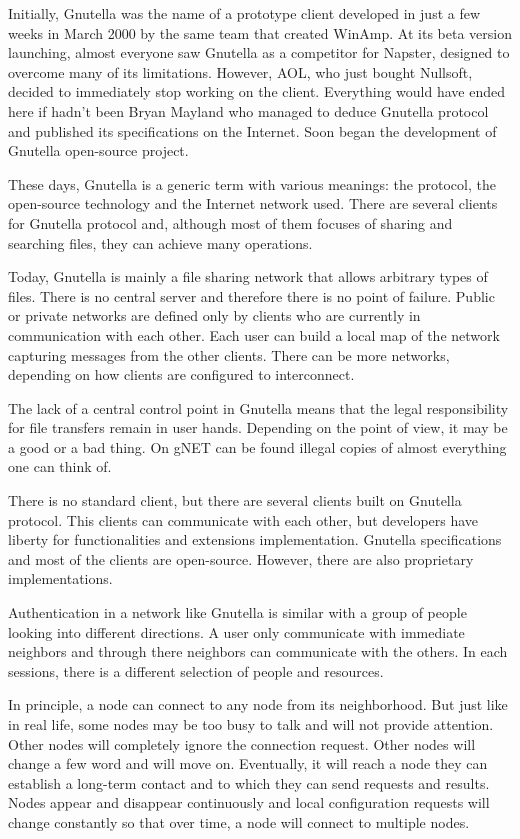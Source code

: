 Initially, Gnutella was the name of a prototype client developed in just a few
weeks in March 2000 by the same team that created WinAmp. At its beta version
launching, almost everyone saw Gnutella as a competitor for Napster, designed
to overcome many of its limitations. However, AOL, who just bought Nullsoft,
decided to immediately stop working on the client. Everything would have ended
here if hadn't been Bryan Mayland who managed to deduce Gnutella protocol and
published its specifications on the Internet. Soon began the development of
Gnutella open-source project.

These days, Gnutella is a generic term with various meanings: the protocol, the
open-source technology and the Internet network used. There are several clients
for Gnutella protocol and, although most of them focuses of sharing and
searching files, they can achieve many operations.

Today, Gnutella is mainly a file sharing network that allows arbitrary types of
files. There is no central server and therefore there is no point of failure.
Public or private networks are defined only by clients who are currently in
communication with each other. Each user can build a local map of the network
capturing messages from the other clients. There can be more networks, depending
on how clients are configured to interconnect.

The lack of a central control point in Gnutella means that the legal
responsibility for file transfers remain in user hands. Depending on the point
of view, it may be a good or a bad thing. On gNET can be found illegal copies
of almost everything one can think of.

There is no standard client, but there are several clients built on Gnutella
protocol. This clients can communicate with each other, but developers have
liberty for functionalities and extensions implementation. Gnutella
specifications and most of the clients are open-source. However, there are
also proprietary implementations.

Authentication in a network like Gnutella is similar with a group of people
looking into different directions. A user only communicate with immediate
neighbors and through there neighbors can communicate with the others. In each
sessions, there is a different selection of people and resources.

In principle, a node can connect to any node from its neighborhood. But just
like in real life, some nodes may be too busy to talk and will not provide
attention. Other nodes will completely ignore the connection request. Other
nodes will change a few word and will move on. Eventually, it will reach a node
they can establish a long-term contact and to which they can send requests and
results. Nodes appear and disappear continuously and local configuration requests
will change constantly so that over time, a node will connect to multiple nodes.

